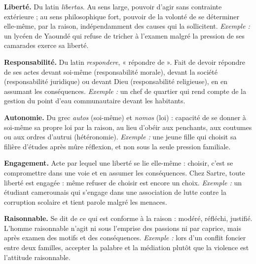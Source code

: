 \documentclass[11pt]{article}
\newcommand{\cle}[1]{{\popxbold\color{popdark}#1}}
\begin{document}
\begin{corrige}
\textbf{\cle{Liberté}.} Du latin \emph{libertas}. Au sens large, pouvoir d'agir sans contrainte extérieure ; au sens philosophique fort, pouvoir de la volonté de se déterminer elle-même, par la raison, indépendamment des causes qui la sollicitent. \emph{Exemple :} un lycéen de Yaoundé qui refuse de tricher à l'examen malgré la pression de ses camarades exerce sa liberté.

\textbf{\cle{Responsabilité}.} Du latin \emph{respondere}, « répondre de ». Fait de devoir répondre de ses actes devant soi-même (responsabilité morale), devant la société (responsabilité juridique) ou devant Dieu (responsabilité religieuse), en en assumant les conséquences. \emph{Exemple :} un chef de quartier qui rend compte de la gestion du point d'eau communautaire devant les habitants.

\textbf{\cle{Autonomie}.} Du grec \emph{autos} (soi-même) et \emph{nomos} (loi) : capacité de se donner à soi-même sa propre loi par la raison, au lieu d'obéir aux penchants, aux coutumes ou aux ordres d'autrui (hétéronomie). \emph{Exemple :} une jeune fille qui choisit sa filière d'études après mûre réflexion, et non sous la seule pression familiale.

\textbf{\cle{Engagement}.} Acte par lequel une liberté se lie elle-même : choisir, c'est se compromettre dans une voie et en assumer les conséquences. Chez Sartre, toute liberté est engagée : même refuser de choisir est encore un choix. \emph{Exemple :} un étudiant camerounais qui s'engage dans une association de lutte contre la corruption scolaire et tient parole malgré les menaces.

\textbf{\cle{Raisonnable}.} Se dit de ce qui est conforme à la raison : modéré, réfléchi, justifié. L'homme raisonnable n'agit ni sous l'emprise des passions ni par caprice, mais après examen des motifs et des conséquences. \emph{Exemple :} lors d'un conflit foncier entre deux familles, accepter la palabre et la médiation plutôt que la violence est l'attitude raisonnable.
\end{corrige}
\end{document}
